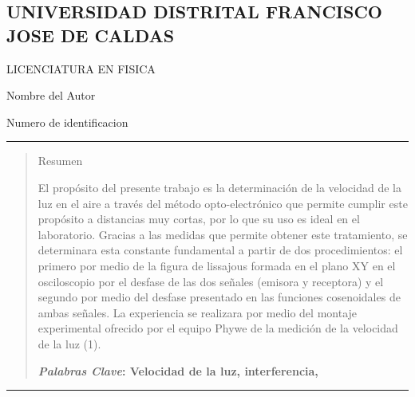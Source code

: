 \documentclass[10pt,a4paper]{article}
\author{Nombre del Autor}
\begin{document}
\begin{center}
\section*{UNIVERSIDAD DISTRITAL FRANCISCO JOSE DE CALDAS}
\end{center}


\begin{center}
LICENCIATURA EN FISICA
\end{center}


\begin{center}
Nombre del Autor
\end{center}


\begin{center}
Numero de identificacion
\end{center}


\vspace*{0.4cm}
\vspace*{-0.4cm}
\begin{center}\rule{0.9\textwidth}{0.1mm} \end{center}

\begin{quote}
\begin{center}
Resumen
\end{center}
El propósito del presente trabajo es la determinación de la velocidad de la luz en el aire a través del método opto-electrónico que permite cumplir este  propósito a distancias muy cortas, por lo que su uso es ideal en el laboratorio. Gracias a las medidas que permite obtener este tratamiento, se determinara  esta constante fundamental a  partir de dos procedimientos: el primero por medio de la figura de lissajous formada en el plano XY en el osciloscopio por el desfase de las dos señales  (emisora y receptora) y el segundo por medio del desfase presentado en las funciones  cosenoidales  de ambas señales. La experiencia  se realizara  por medio del montaje experimental ofrecido por el equipo Phywe de la medición de la velocidad de la luz (1). 

\textbf{\emph{Palabras Clave}: Velocidad de la luz, interferencia,}
\end{quote}

\begin{center}\rule{0.9\textwidth}{0.1mm} \end{center}
\vspace*{0.5cm}
\end{document}
